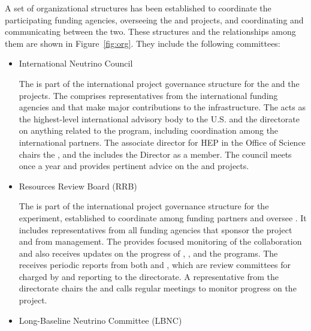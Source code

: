 A set  of  organizational structures  has been established  to
coordinate  the  participating  funding agencies,
overseeing the  and  projects,
and coordinating and communicating between the 
two. These structures and the relationships among them are shown 
in Figure~\ref{fig:org}. They include %
the following committees:
\begin{itemize}
\item International Neutrino Council 

The  is part of the international project governance structure for the   and the   projects. The  comprises representatives from the international funding agencies and   that make major contributions to the infrastructure. 
The  acts as the highest-level international advisory body to the U.S.   and the   directorate on anything related to the program, including coordination among the international partners. The associate director for HEP in the  Office of Science chairs the , and the  includes the   Director as a member. The council meets once a year and provides pertinent advice on the  and   projects.

\item Resources Review Board (RRB)

The    is part of the international project governance structure for the   experiment, established to coordinate among funding partners and oversee . It includes representatives from all funding agencies that sponsor the project and  from  management. The   provides focused monitoring of the  collaboration and also receives updates on the progress of ,  , and the  programs. The   receives periodic reports from both  and , which are review committees for  charged by and reporting to the  directorate. A representative from the  directorate chairs the  and calls regular meetings to monitor progress on the  project.



\item Long-Baseline Neutrino Committee (LBNC)


\end{itemize}
